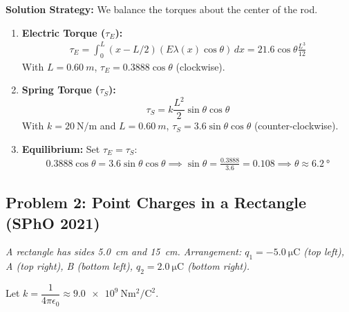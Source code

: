 \documentclass{article}
\numberwithin{equation}{section}
\begin{document}
\textbf{Solution Strategy:} We balance the torques about the center of the rod.
\begin{enumerate}
    \item \textbf{Electric Torque ($\tau_E$):}
    \begin{align*}
        \tau_E = \int_0^L (x - L/2) (E \lambda(x) \cos\theta) \,dx = 21.6 \cos\theta \frac{L^3}{12}
    \end{align*}
    With $L = \SI{0.60}{m}$, $\tau_E = 0.3888 \cos\theta$ (clockwise).

    \item \textbf{Spring Torque ($\tau_S$):}
    $$ \tau_S = k \frac{L^2}{2} \sin\theta \cos\theta $$
    With $k=\SI{20}{\newton\per\meter}$ and $L = \SI{0.60}{m}$, $\tau_S = 3.6 \sin\theta \cos\theta$ (counter-clockwise).

    \item \textbf{Equilibrium:} Set $\tau_E = \tau_S$:
    \begin{align*}
        0.3888 \cos\theta = 3.6 \sin\theta \cos\theta \implies \sin\theta = \frac{0.3888}{3.6} = 0.108 \implies \theta \approx \SI{6.2}{\degree}
    \end{align*}
\end{enumerate}

\hrulefill
\subsection{Problem 2: Point Charges in a Rectangle (SPhO 2021)}
\textit{A rectangle has sides \SI{5.0}{cm} and \SI{15}{cm}. Arrangement: $q_1 = \SI{-5.0}{\micro\coulomb}$ (top left), A (top right), B (bottom left), $q_2 = \SI{+2.0}{\micro\coulomb}$ (bottom right).}

\begin{center}
\end{center}

Let $k = \dfrac{1}{4\pi\epsilon_0} \approx \SI{9.0e9}{\newton\meter\squared\per\coulomb\squared}$.
\end{document}

